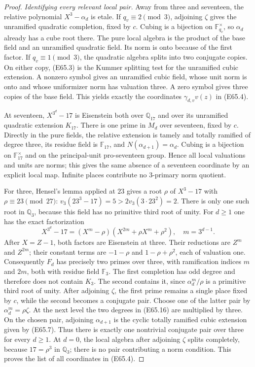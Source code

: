 \begin{proof}
\emph{Identifying every relevant local pair.}
Away from three and seventeen, the relative polynomial
$X^3-\alpha_d$ is etale. If $q_v\equiv2\pmod3$, adjoining $\zeta$
gives the unramified quadratic completion, fixed by $c$.
Cubing is a bijection on $\mathbb F_{q_v}^\times$, so
$\alpha_d$ already has a cube root there. The pure local algebra is
the product of the base field and an unramified quadratic field.
Its norm is onto because of the first factor.
If $q_v\equiv1\pmod3$, the quadratic algebra splits into two
conjugate copies. On either copy, (E65.3) is the Kummer splitting
test for the unramified cubic extension. A nonzero symbol gives an
unramified cubic field, whose unit norm is onto and whose uniformizer
norm has valuation three. A zero symbol gives three copies of the
base field. This yields exactly the coordinates
$\gamma_{d,v}v(z)$ in (E65.4).

At seventeen, $X^{3^d}-17$ is Eisenstein both over $\mathbb Q_{17}$
and over its unramified quadratic extension $K_{17}$.
There is one prime in $M_d$ over seventeen, fixed by $c$.
Directly in the pure fields, the relative extension is tamely and
totally ramified of degree three, its residue field is
$\mathbb F_{17}$, and
$N(\alpha_{d+1})=\alpha_d$.
Cubing is a bijection on $\mathbb F_{17}^\times$ and on the
principal-unit pro-seventeen group. Hence all local valuations and
units are norms; this gives the same absence of a seventeen
coordinate by an explicit local map.
Infinite places contribute no $3$-primary norm quotient.

For three, Hensel's lemma applied at $23$ gives a root $\rho$ of
$X^3-17$ with $\rho\equiv23\pmod{27}$:
$v_3(23^3-17)=5>2v_3(3\cdot23^2)=2$.
There is only one such root in $\mathbb Q_3$, because this field has
no primitive third root of unity.
For $d\ge1$ one has the exact factorization
\[
 X^{3^d}-17=(X^m-\rho)
                   (X^{2m}+\rho X^m+\rho^2),\quad m=3^{d-1}.
 \tag{E65.16}
\]
After $X=Z-1$, both factors are Eisenstein at three.
Their reductions are $Z^m$ and $Z^{2m}$; their constant terms
are $-1-\rho$ and $1-\rho+\rho^2$, each of valuation one.
Consequently $F_d$ has precisely two primes over three, with
ramification indices $m$ and $2m$, both with residue field
$\mathbb F_3$.
The first completion has odd degree and therefore does not contain
$K_3$. The second contains it, since
$\alpha_d^m/\rho$ is a primitive third root of unity.
After adjoining $\zeta$, the first prime remains a single place
fixed by $c$, while the second becomes a conjugate pair.
Choose one of the latter pair by
$\alpha_d^m=\rho\zeta$.
At the next level the two degrees in (E65.16) are multiplied by
three. On the chosen pair, adjoining $\alpha_{d+1}$ is the cyclic
totally ramified cubic extension given by (E65.7).
Thus there is exactly one nontrivial conjugate pair over three for
every $d\ge1$.
At $d=0$, the local algebra after adjoining $\zeta$ splits completely,
because $17=\rho^3$ in $\mathbb Q_3$; there is no pair contributing
a norm condition.
This proves the list of all coordinates in (E65.4).


\end{proof}
